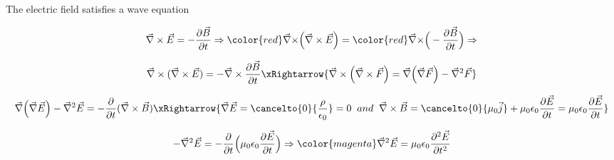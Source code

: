 \begin{frame}{The electric field satisfies a wave equation}

\begin{equation*}
  \vec{\nabla} \times \vec{E} = -\frac{\partial \vec{B}}{\partial t} \Rightarrow
  {\color{red} \vec{\nabla} \times} \Big( \vec{\nabla} \times \vec{E} \Big) =
  {\color{red} \vec{\nabla} \times} \Big( -\frac{\partial \vec{B}}{\partial t} \Big) \Rightarrow
\end{equation*}

\begin{equation*}
  \vec{\nabla} \times (\vec{\nabla} \times \vec{E}) =
  - \vec{\nabla} \times \frac{\partial \vec{B}}{\partial t}
  \xRightarrow{ \vec{\nabla} \times \Big( \vec{\nabla} \times \vec{F} \Big) =
                \vec{\nabla} \Big( \vec{\nabla} \vec{F} \Big) - \vec{\nabla}^{2} \vec{F} }
\end{equation*}

\begin{equation*}
  \vec{\nabla} \Big( \vec{\nabla} \vec{E} \Big) - \vec{\nabla}^{2} \vec{E} =
  - \frac{\partial}{\partial t} (\vec{\nabla} \times \vec{B})
  \xRightarrow{
      \vec{\nabla} \vec{E} = \cancelto{0}{\frac{\rho}{\epsilon_0}} = 0
       \;\; and \;\;
      \vec{\nabla} \times \vec{B} =
           \cancelto{0}{\mu_0 \vec{j}} +\mu_0 \epsilon_0 \frac{\partial \vec{E}}{\partial t} =
           \mu_0 \epsilon_0 \frac{\partial \vec{E}}{\partial t}
  }
\end{equation*}

\begin{equation*}
  - \vec{\nabla}^{2} \vec{E} =
  - \frac{\partial}{\partial t} \Big( \mu_0 \epsilon_0 \frac{\partial \vec{E}}{\partial t} \Big)
  \Rightarrow
  {\color{magenta}
     \vec{\nabla}^{2} \vec{E} =
     \mu_0 \epsilon_0 \frac{\partial^{2} \vec{E}}{\partial t^{2}}
  }
\end{equation*}

\end{frame}


%
%
%
%


